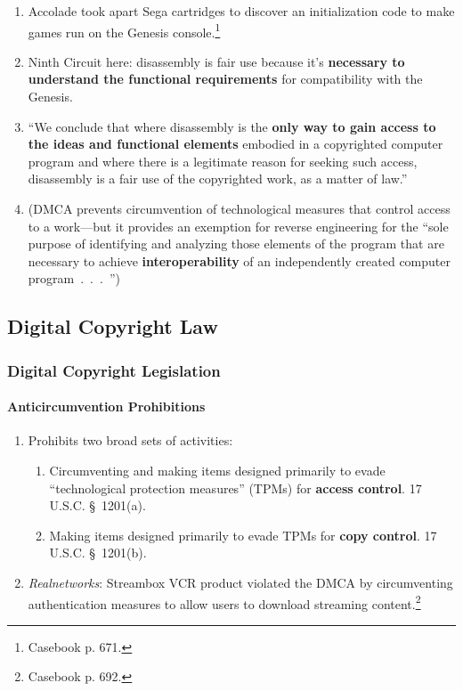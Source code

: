 \begin{enumerate}
    \item Accolade took apart Sega cartridges to discover an initialization 
    code to make games run on the Genesis console.\footnote{Casebook p. 671.}
    \item Ninth Circuit here: disassembly is fair use because it's 
    \textbf{necessary to understand the functional requirements} for 
    compatibility with the Genesis.
    \item ``We conclude that where disassembly is the \textbf{only way to gain access 
    to the ideas and functional elements} embodied in a copyrighted computer 
    program and where there is a legitimate reason for seeking such access, 
    disassembly is a fair use of the copyrighted work, as a matter of 
    law.''
    \item (DMCA prevents circumvention of technological measures that control 
    access to a work---but it provides an exemption for reverse engineering 
    for the ``sole purpose of identifying and analyzing those elements of the 
    program that are necessary to achieve \textbf{interoperability} of an 
    independently created computer program~.~.~.~'')
\end{enumerate}

\subsection{Digital Copyright Law}

\subsubsection{Digital Copyright Legislation}

\paragraph{Anticircumvention Prohibitions}

\begin{enumerate}
    \item Prohibits two broad sets of activities:
    \begin{enumerate}
        \item Circumventing and making items designed primarily to evade 
        ``technological protection measures'' (TPMs) for \textbf{access 
        control}. 17 U.S.C. \S\ 1201(a).
        \item Making items designed primarily to evade TPMs for \textbf{copy 
        control}. 17 U.S.C. \S\ 1201(b).
    \end{enumerate}
    \item \emph{Realnetworks}: Streambox VCR product violated the DMCA by 
    circumventing authentication measures to allow users to download streaming 
    content.\footnote{Casebook p. 692.}
\end{enumerate}

